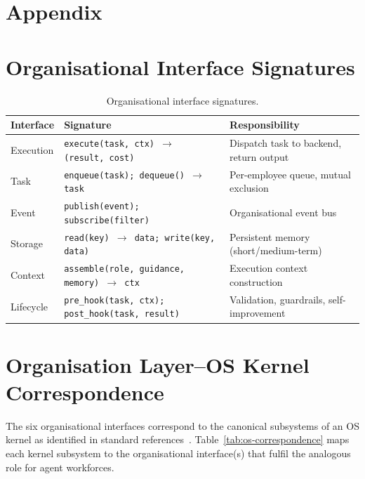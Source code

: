 \appendix
\section*{Appendix}



\section{Organisational Interface Signatures}
\label{sec:harness-signatures}

\begin{table}[H]
\centering
\caption{Organisational interface signatures.}
\label{tab:harness-interfaces}
\small
\setlength{\tabcolsep}{4pt}
\begin{tabularx}{\textwidth}{@{}>{\ttfamily\raggedright\arraybackslash}p{}>{\raggedright\arraybackslash}p{}X@{}}
\toprule
\textbf{Interface} & \textbf{Signature} & \textbf{Responsibility} \\
\midrule
Execution & \texttt{execute(task, ctx) $\to$ (result, cost)} & Dispatch task to backend, return output \\
\addlinespace
Task & \texttt{enqueue(task); dequeue() $\to$ task} & Per-employee queue, mutual exclusion \\
\addlinespace
Event & \texttt{publish(event); subscribe(filter)} & Organisational event bus \\
\addlinespace
Storage & \texttt{read(key) $\to$ data; write(key, data)} & Persistent memory (short/medium-term) \\
\addlinespace
Context & \texttt{assemble(role, guidance, memory) $\to$ ctx} & Execution context construction \\
\addlinespace
Lifecycle & \texttt{pre\_hook(task, ctx); post\_hook(task, result)} & Validation, guardrails, self-improvement \\
\bottomrule
\end{tabularx}
\end{table}

\section{Organisation Layer--OS Kernel Correspondence}
\label{sec:os-mapping}

The six organisational interfaces correspond to the canonical subsystems of an OS kernel as identified in standard references~\cite{tanenbaum2014modern, silberschatz2018os}.  Table~\ref{tab:os-correspondence} maps each kernel subsystem to the organisational interface(s) that fulfil the analogous role for agent workforces.

